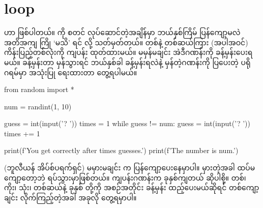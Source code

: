 \begin{figure}[tb!]
\caption{}
\label{fig:ch07chkbrd}
\end{figure}

\section{ loop}
  ဟာ  ဖြစ်ပါတယ်။  ကို စတင် လုပ်ဆောင်တဲ့အချိန်မှာ ဘယ်နှစ်ကြိမ် ပြန်ကျော့မလဲ အတိအကျ ကြို ‘မသိ’ ရင်   လို့ သတ်မှတ်တယ်။ တစ်နဲ့ တစ်ဆယ်ကြား (အပါအဝင်) ကိန်းပြည့်တစ်လုံးကို ကျပန်း  ထုတ်ထားမယ်။ မမှန်မချင်း အဲဒီဂဏန်းကို ခန့်မှန်းပေးရမယ်။ ခန့်မှန်းတာ မှန်သွားရင် ဘယ်နှစ်ခါ ခန့်မှန်းရလဲနဲ့ မှန်တဲ့ဂဏန်းကို ပြပေးတဲ့ ပရိုဂရမ်မှာ   အသုံးပြု ရေးထားတာ တွေ့ရပါမယ်။

%
\begin{py}
from random import *

num = randint(1, 10)

guess = int(input('? '))
times = 1
while guess != num:
    guess = int(input('? '))
    times += 1

print(f'You get correctly after {times} guesses.')
print(f'The number is {num}.')
\end{py}
%

 (ဘူလီယန် အိပ်စ်ပရက်ရှင်) မမှားမချင်း  က ပြန်ကျော့ပေးနေမှာပါ။ မှားတဲ့အခါ ထပ်မကျော့တော့ဘဲ ရပ်သွားမှာဖြစ်တယ်။ ကျပန်းဂဏန်းက ခုနှစ်ကျတယ် ဆိုပါစို့။ တစ်၊ ကိုး၊ သုံး၊ တစ်ဆယ်နဲ့ ခုနှစ် တို့ကို အစဉ်အတိုင်း ခန့်မှန်း ထည့်ပေးမယ်ဆိုရင် တစ်ကျော့ချင်း လိုက်ကြည့်တဲ့အခါ အခုလို တွေ့ရမှာပါ။

